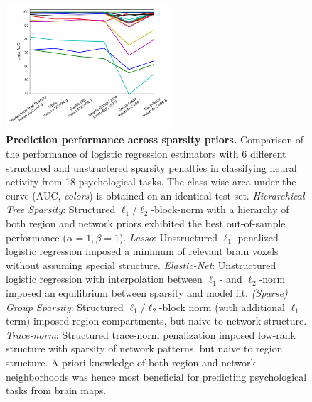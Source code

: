 \documentclass{article}
\begin{document}
\begin{figure}
\begin{centering}
\includegraphics[width=0.55\textwidth]{../figures/ROC_ALL.png}
\vspace{-0.4cm}
\caption{\textbf{Prediction performance across sparsity priors.}
Comparison of the performance of logistic regression estimators
with 6 different structured and unstructered sparsity penalties
in classifying neural activity from 18 psychological tasks.
The class-wise area under the curve (AUC, \textit{colors})
is obtained on an identical test set.
%
\textit{Hierarchical Tree Sparsity}: Structured
$\ell_1/\ell_2$-block-norm with a hierarchy of
both region and network priors
exhibited the best out-of-sample performance
($\alpha = 1, \beta = 1$).
\textit{Lasso}: Unstructured $\ell_1$-penalized logistic regression
imposed a minimum of relevant brain voxels without
assuming special structure.
\textit{Elastic-Net}: Unstructured logistic regression
with interpolation between $\ell_1$- and $\ell_2$-norm 
imposed an equilibrium between sparsity and model fit.
\textit{(Sparse) Group Sparsity}: Structured $\ell_1/\ell_2$-block
norm (with additional $\ell_1$ term)
imposed region compartments, but naive to network structure.
\textit{Trace-norm}: Structured trace-norm penalization
imposed low-rank structure
with sparsity of network patterns, but naive to region structure.
%
A priori knowledge of both region and network neighborhoods
was hence most beneficial for predicting psychological tasks from
brain maps.
}
\end{centering}
\label{fig_sparsities}
\end{figure}


\end{document}
